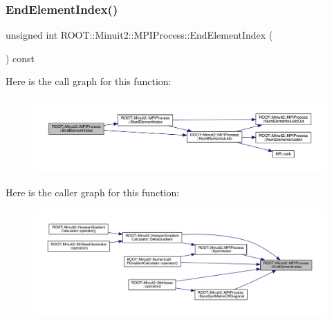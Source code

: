 \subsubsection{\texorpdfstring{EndElementIndex()}{EndElementIndex()}\hspace{0.1cm}{\footnotesize\ttfamily [1/2]}}
{\footnotesize\ttfamily unsigned int R\+O\+O\+T\+::\+Minuit2\+::\+M\+P\+I\+Process\+::\+End\+Element\+Index (\begin{DoxyParamCaption}{ }\end{DoxyParamCaption}) const\hspace{0.3cm}{\ttfamily [inline]}}

Here is the call graph for this function\+:
\nopagebreak
\begin{figure}[H]
\begin{center}
\leavevmode
\includegraphics[width=350pt]{dc/d43/classROOT_1_1Minuit2_1_1MPIProcess_af4445148831dec4961d5f8aa99aeb2c1_cgraph}
\end{center}
\end{figure}
Here is the caller graph for this function\+:\nopagebreak
\begin{figure}[H]
\begin{center}
\leavevmode
\includegraphics[width=350pt]{dc/d43/classROOT_1_1Minuit2_1_1MPIProcess_af4445148831dec4961d5f8aa99aeb2c1_icgraph}
\end{center}
\end{figure}
\mbox{\label{classROOT_1_1Minuit2_1_1MPIProcess_af4445148831dec4961d5f8aa99aeb2c1}} 

